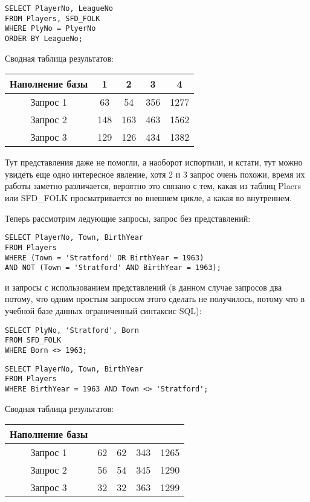 \documentclass[a4paper,12pt]{article}
\begin{document}
\begin{lstlisting}
SELECT PlayerNo, LeagueNo
FROM Players, SFD_FOLK
WHERE PlyNo = PlyerNo
ORDER BY LeagueNo;
\end{lstlisting}

Сводная таблица результатов:

\begin{tabular}[t]{|c|c|c|c|c|}
\hline
Наполнение базы  &    1 &    2 &    3 &    4 \\
\hline
Запрос 1         &   63 &   54 &  356 & 1277 \\
\hline
Запрос 2         &  148 &  163 &  463 & 1562 \\
\hline
Запрос 3         &  129 &  126 &  434 & 1382 \\
\hline
\end{tabular}

Тут представления даже не помогли, а наоборот испортили, и кстати, тут можно увидеть еще одно интересное явление, хотя 2 и 3 запрос очень похожи, время их работы заметно различается, вероятно это связано с тем, какая из таблиц Plaers или SFD\_FOLK просматривается во внешнем цикле, а какая во внутреннем.

Теперь рассмотрим ледующие запросы, запрос без представлений:

\begin{lstlisting}
SELECT PlayerNo, Town, BirthYear
FROM Players
WHERE (Town = 'Stratford' OR BirthYear = 1963)
AND NOT (Town = 'Stratford' AND BirthYear = 1963);
\end{lstlisting}

и запросы с использованием представлений (в данном случае запросов два потому, что одним простым запросом этого сделать не получилось, потому что в учебной базе данных ограниченный синтаксис SQL):

\begin{lstlisting}
SELECT PlyNo, 'Stratford', Born
FROM SFD_FOLK
WHERE Born <> 1963;
\end{lstlisting}

\begin{lstlisting}
SELECT PlayerNo, Town, BirthYear
FROM Players
WHERE BirthYear = 1963 AND Town <> 'Stratford';
\end{lstlisting}

Сводная таблица результатов:

\begin{tabular}[t]{|c|c|c|c|c|}
\hline
Наполнение базы & & & & \\
\hline
Запрос 1        &   62 &   62 &  343 & 1265 \\
\hline
Запрос 2        &   56 &   54 &  345 & 1290 \\
\hline
Запрос 3        &   32 &   32 &  363 & 1299 \\
\hline
\end{tabular}
\end{document}
